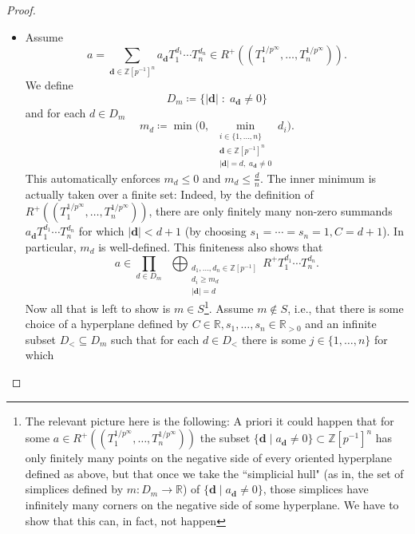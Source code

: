 \documentclass[10pt,twoside]{article}
\numberwithin{equation}{section}
\theoremstyle{plain}
\theoremstyle{definition}
\newcommand{\ZZ}{\mathbb{Z}}
\newcommand{\RR}{\mathbb{R}}
\newcommand{\pRoots}{{1/p^\infty}}
\newcommand{\ZZip}{\ZZ[p^{-1}]}
\begin{document}
\begin{proof}
\begin{itemize}
\[        R^+ T_1^{d_1}\cdots T_n^{d_n}\]
        for some \(m\in S\). Let \(H\) be an oriented hyperplane defined by \(s_1,\dots,s_n,C\). Then by the discussion about \(S\) above only finitely many \(d\in D_m\) define shifted simplices having at least one point lying on the negative side of \(H\), and any such \((d,m_d)\) can contribute only finitely many summands, so in total, \(a\) has only finitely many non-zero summands \(a_{\mathbf{d}}^{}T_1^{d_1}\cdots T_n^{d_n}\) such that \(\mathbf{d}\) lies on the negative side of \(H\). Thus \(a\in R^+((T_1^{\pRoots},\dots,T_n^{\pRoots}))\).
        \item["\(\subseteq\)":] Assume 
        \[a=\sum_{\mathbf{d}\in \ZZip^n} a_{\mathbf{d}}^{}T_1^{d_1}\cdots T_n^{d_n}\in R^+((T_1^{\pRoots},\dots,T_n^{\pRoots})).\]
        We define 
        \[D_m\coloneqq\{|\mathbf d|\;:\; a_{\mathbf d}\neq 0\}\]
        and for each \(d\in D_m\)
        \[m_d\coloneqq \min\Big(0,\;
        \min_{\substack{i\in\{1,\dots,n\}\\\mathbf d\in \ZZip^n\\|\mathbf d|=d,\;a_{\mathbf d}\neq 0}} d_i\Big).\]
        This automatically enforces \(m_d\leq 0\) and \(m_d\leq \frac dn\). The inner minimum is actually taken over a finite set: Indeed, by the definition of \(R^+((T_1^{\pRoots},\dots, T_n^{\pRoots}))\), there are only finitely many non-zero summands \(a_{\mathbf d}T_1^{d_1}\cdots T_n^{d_n}\) for which \(|\mathbf d|<d+1\) (by choosing \(s_1=\cdots=s_n=1, C= d+1\)). In particular, \(m_d\) is well-defined. This finiteness also shows that
        \[a\in\prod_{d\in D_m}
        \;\;\bigoplus_{\substack{d_1,\dots,d_n\in \ZZ[p^{-1}]\\
        d_i\geq m_d\\
        |\mathbf d|=d}}
        R^+ T_1^{d_1}\cdots T_n^{d_n}.\]
        Now all that is left to show is \(m\in S\)\footnote{The relevant picture here is the following: A priori it could happen that for some \(a\in R^+((T_1^{\pRoots},\dots, T_n^{\pRoots}))\) the subset \(\{\mathbf d \mid a_{\mathbf d}\neq 0\}\subset \ZZip^n\) has only finitely many points on the negative side of every oriented hyperplane defined as above, but that once we take the ``simplicial hull" (as in, the set of simplices defined by \(m\colon D_m\to \RR\)) of \(\{\mathbf d \mid a_{\mathbf d}\neq 0\}\), those simplices have infinitely many corners on the negative side of some hyperplane. We have to show that this can, in fact, not happen}. Assume \(m\notin S\), i.e., that there is some choice of a hyperplane defined by \(C\in \RR,s_1,\dots,s_n\in \RR_{>0}\) and an infinite subset \(D_<\subseteq D_m\) such that for each \(d\in D_<\) there is some \(j\in \{1,\dots,n\}\) for which

\end{itemize}
\end{proof}
\end{document}
